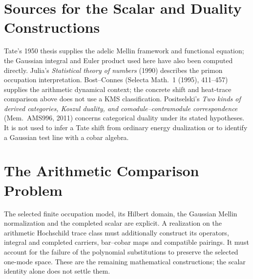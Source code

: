 \section{Sources for the Scalar and Duality Constructions}
\label{v4-arith:prim-zeta:disjoint-sources}
\begin{remark}
\label{v4-arith:prim-zeta:rem:sources}
\label{v4-arith:prim-zeta:rem:sources-disjoint}
Tate's 1950 thesis supplies the adelic Mellin framework and functional
equation; the Gaussian integral and Euler product used here have also
been computed directly. Julia's \emph{Statistical theory of numbers}
(1990) describes the primon occupation interpretation. Bost--Connes
(Selecta Math.~1 (1995), 411--457) supplies the arithmetic dynamical
context; the concrete shift and heat-trace comparison above does not
use a KMS classification. Positselski's \emph{Two kinds of derived
categories, Koszul duality, and comodule--contramodule correspondence}
(Mem.~AMS996, 2011) concerns categorical duality under its stated
hypotheses. It is not used to infer a Tate shift from ordinary energy
dualization or to identify a Gaussian test line with a cobar algebra.
\end{remark}

\section{The Arithmetic Comparison Problem}
\label{v4-arith:prim-zeta:summary}
The selected finite occupation model, its Hilbert domain, the Gaussian
Mellin normalization and the completed scalar are explicit. A realization
on the arithmetic Hochschild trace class must additionally construct its
operators, integral and completed carriers, bar--cobar maps and compatible
pairings. It must account for the failure of the polynomial substitutions
to preserve the selected one-mode space. These are the remaining
mathematical constructions; the scalar identity alone does not settle them.
